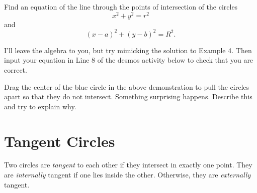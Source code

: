 \documentclass{ximera}
\begin{document}
\begin{example} \label{Ex4c}
Find an equation of the line through the points of intersection of the circles
\[
    x^2 + y^2 = r^2
\]
and 
\[
   (x-a)^2 + (y-b)^2=R^2.
\]
\end{example}

\begin{explanation}
I'll leave the algebra to you, but try mimicking the solution to Example 4. Then input your equation in Line 8 of the desmos activity below to check that you are correct.

\begin{onlineOnly}
    \begin{center}
\end{center}
\end{onlineOnly}

\begin{question}
Drag the center of the blue circle in the above demonstration to pull the circles apart so that they do not intersect. Something surprising happens. Describe this and try to explain why.
\end{question}

\end{explanation}

\section*{Tangent Circles}
Two circles are \emph{tangent} to each other if they intersect in  exactly one point. They are \emph{internally} tangent if one lies inside the other. Otherwise, they are \emph{externally} tangent.
\end{document}
